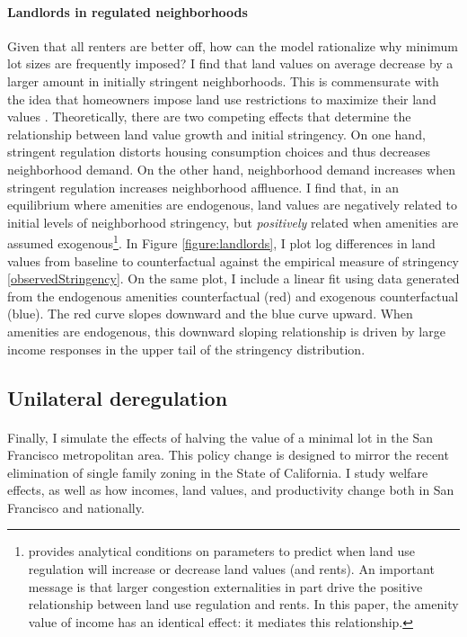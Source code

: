 \documentclass[12pt]{article}
\begin{document}
\paragraph*{Landlords in regulated neighborhoods}
Given that all renters are better off, how can the model rationalize why minimum lot sizes are frequently imposed? I find that land values on average decrease by a larger amount in initially stringent neighborhoods. This is commensurate with the idea that homeowners impose land use restrictions to maximize their land values \citep{parkho, HILBER2013, homevoterhypothesis}. Theoretically, there are two competing effects that determine the relationship between land value growth and initial stringency. On one hand, stringent regulation distorts housing consumption choices and thus decreases neighborhood demand. On the other hand, neighborhood demand increases when stringent regulation increases neighborhood affluence. I find that, in an equilibrium where amenities are endogenous, land values are negatively related to initial levels of neighborhood stringency, but \textit{positively} related when amenities are assumed exogenous\footnote{\cite{parkho} provides analytical conditions on parameters to predict when land use regulation will increase or decrease land values (and rents). An important message is that larger congestion externalities in part drive the positive relationship between land use regulation and rents. In this paper, the amenity value of income has an identical effect: it mediates this relationship.}. In Figure \ref{figure:landlords}, I plot log differences in land values from baseline to counterfactual against the empirical measure of stringency \eqref{observedStringency}. On the same plot, I include a linear fit using data generated from the endogenous amenities counterfactual (red) and exogenous counterfactual (blue). The red curve slopes downward and the blue curve upward. When amenities are endogenous, this downward sloping relationship is driven by large income responses in the upper tail of the stringency distribution. 


\subsection{Unilateral deregulation}
\paragraph*{}
Finally, I simulate the effects of halving the value of a minimal lot in the San Francisco metropolitan area. This policy change is designed to mirror the recent elimination of single family zoning in the State of California. I study welfare effects, as well as how incomes, land values, and productivity change both in San Francisco and nationally.
\end{document}
